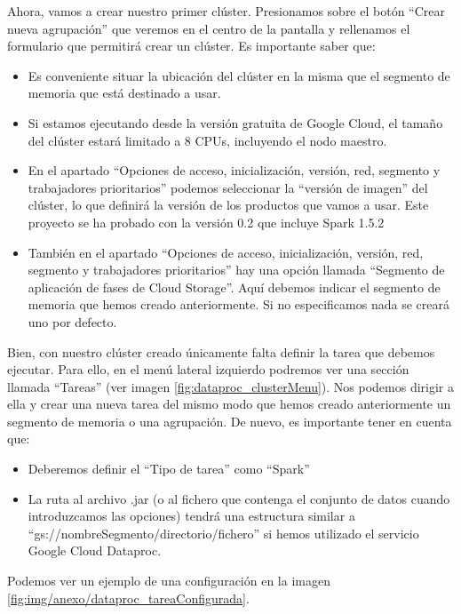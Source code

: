 Ahora, vamos a crear nuestro primer clúster. Presionamos sobre el botón ``Crear nueva agrupación'' que veremos en el centro de la pantalla y rellenamos el formulario que permitirá crear un clúster. Es importante saber que:

\begin{itemize}
\item Es conveniente situar la ubicación del clúster en la misma que el segmento de memoria que está destinado a usar.
\item Si estamos ejecutando desde la versión gratuita de Google Cloud, el tamaño del clúster estará limitado a 8 CPUs, incluyendo el nodo maestro.
\item En el apartado ``Opciones de acceso, inicialización, versión, red, segmento y trabajadores prioritarios'' podemos seleccionar la ``versión de imagen'' del clúster, lo que definirá la versión de los productos que vamos a usar. Este proyecto se ha probado con la versión 0.2 que incluye Spark 1.5.2
\item También en el apartado ``Opciones de acceso, inicialización, versión, red, segmento y trabajadores prioritarios'' hay una opción llamada ``Segmento de aplicación de fases de Cloud Storage''. Aquí debemos indicar el segmento de memoria que hemos creado anteriormente. Si no especificamos nada se creará uno por defecto.
\end{itemize}


Bien, con nuestro clúster creado únicamente falta definir la tarea que debemos ejecutar.
Para ello, en el menú lateral izquierdo podremos ver una sección llamada ``Tareas'' (ver imagen \ref{fig:dataproc_clusterMenu}). Nos podemos dirigir a ella y crear una nueva tarea del mismo modo que hemos creado anteriormente un segmento de memoria o una agrupación. De nuevo, es importante tener en cuenta que:

\begin{itemize}
\item Deberemos definir el ``Tipo de tarea'' como ``Spark''
\item La ruta al archivo .jar (o al fichero que contenga el conjunto de datos cuando introduzcamos las opciones) tendrá una estructura similar a ``gs://nombreSegmento/directorio/fichero'' si hemos utilizado el servicio Google Cloud Dataproc.
\end{itemize}

Podemos ver un ejemplo de una configuración en la imagen \ref{fig:img/anexo/dataproc_tareaConfigurada}.

